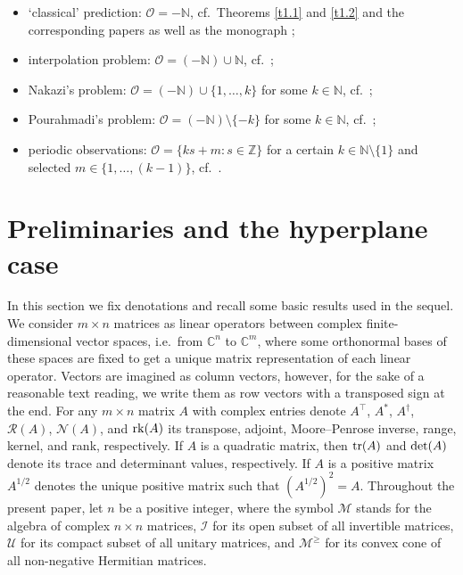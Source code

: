 \documentclass{amsart}
\begin{document}
\begin{itemize}
\item `classical' prediction: ${\mathcal O}= - {\mathbb N}$, cf.~Theorems \ref{t1.1} and \ref{t1.2} and the corresponding papers \cite{HL,WM} as well as the monograph \cite{R};
\item interpolation problem: ${\mathcal O} = (- {\mathbb N}) \cup {\mathbb N}$, cf.~\cite{MW};
\item Nakazi's problem: ${\mathcal O} = (- {\mathbb N}) \cup \{ 1,\ldots,k\}$ for some $k \in {\mathbb N}$, cf.~\cite{KL};
\item Pourahmadi's problem: ${\mathcal O} = (- {\mathbb N}) \setminus \{ -k \}$ for some $k \in \mathbb N$, cf.~\cite{KL};
\item periodic observations: ${\mathcal O} = \{ ks+m : s \in {\mathbb Z} \}$ for a certain $k \in {\mathbb N} \setminus \{ 1 \}$ and selected $m \in \{ 1,\ldots,(k-1) \}$, cf.~\cite{KM}.
\end{itemize}

\section{Preliminaries and the hyperplane case}
\label{s2}

In this section we fix denotations and recall some basic results used in the sequel. We consider $m \times n$ matrices as linear operators between complex finite-dimensio\-nal vector spaces, i.e.~from ${\mathbb C}^n$ to ${\mathbb C}^m$, where some orthonormal bases of these spaces are fixed to get a unique matrix representation of each linear operator. Vectors are imagined as column vectors, however, for the sake of a reasonable text reading, we write them as row vectors with a transposed sign at the end. 
For any $m \times n$ matrix $A$ with complex entries denote $A^{\top}$, $A^*$, $A^\dagger$, ${\mathcal R}(A)$, ${\mathcal N}(A)$, and ${\rm rk}(A)$ its transpose, adjoint, Moore--Penrose inverse, range, kernel, and rank, respectively. If $A$ is a quadratic matrix, then ${\rm tr}(A)$ and ${\rm det}(A)$ denote its trace and determinant values, respectively. If $A$ is a positive matrix $A^{1/2}$ denotes the unique positive matrix such that $(A^{1/2})^2=A$.
Throughout the present paper, let $n$ be a positive integer, where the symbol $\mathcal M$ stands for the algebra of complex $n \times n$ matrices, $\mathcal I$ for its open subset of all invertible matrices, $\mathcal U$ for its compact subset of all unitary matrices, and ${\mathcal M}^{\geq}$ for its convex cone of all non-negative Hermitian matrices.
\end{document}
